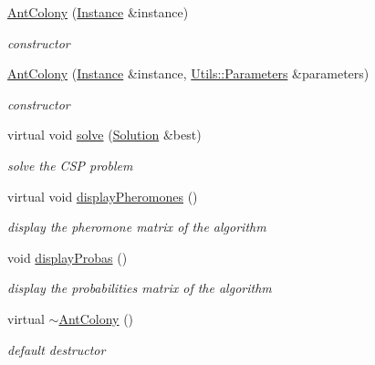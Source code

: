 \begin{DoxyCompactItemize}
\item 
\hyperlink{classAntColony_a082dd31637cdb16ea30ae7d970acff90}{Ant\+Colony} (\hyperlink{classInstance}{Instance} \&instance)
\begin{DoxyCompactList}\small\item\em constructor \end{DoxyCompactList}\item 
\hyperlink{classAntColony_ab7cfdb8699636f37d7836881e0ff1f7e}{Ant\+Colony} (\hyperlink{classInstance}{Instance} \&instance, \hyperlink{classUtils_1_1Parameters}{Utils\+::\+Parameters} \&parameters)
\begin{DoxyCompactList}\small\item\em constructor \end{DoxyCompactList}\item 
virtual void \hyperlink{classAntColony_a2928867b4646afc1c3d553848ed093aa}{solve} (\hyperlink{classSolution}{Solution} \&best)
\begin{DoxyCompactList}\small\item\em solve the C\+SP problem \end{DoxyCompactList}\item 
virtual void \hyperlink{classAntColony_a1cc0338e6d7d5be3cc190b1d037b569e}{display\+Pheromones} ()\hypertarget{classAntColony_a1cc0338e6d7d5be3cc190b1d037b569e}{}\label{classAntColony_a1cc0338e6d7d5be3cc190b1d037b569e}

\begin{DoxyCompactList}\small\item\em display the pheromone matrix of the algorithm \end{DoxyCompactList}\item 
void \hyperlink{classAntColony_afe90d8ff57da5f0a7411b7a8c7f4b009}{display\+Probas} ()\hypertarget{classAntColony_afe90d8ff57da5f0a7411b7a8c7f4b009}{}\label{classAntColony_afe90d8ff57da5f0a7411b7a8c7f4b009}

\begin{DoxyCompactList}\small\item\em display the probabilities matrix of the algorithm \end{DoxyCompactList}\item 
virtual \hyperlink{classAntColony_ac50189ad7f87ce47cbd1753bf6abd109}{$\sim$\+Ant\+Colony} ()\hypertarget{classAntColony_ac50189ad7f87ce47cbd1753bf6abd109}{}\label{classAntColony_ac50189ad7f87ce47cbd1753bf6abd109}

\begin{DoxyCompactList}\small\item\em default destructor \end{DoxyCompactList}\end{DoxyCompactItemize}
